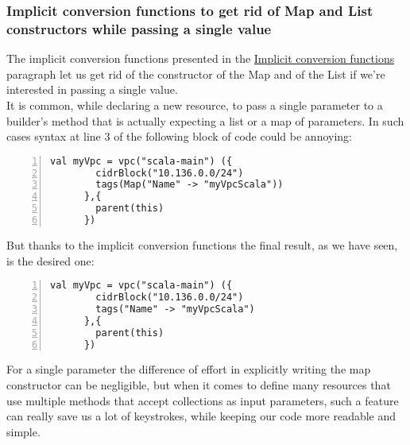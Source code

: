 \subsubsection{Implicit conversion functions to get rid of Map and List constructors while passing a single value}
The implicit conversion functions presented in the \hyperref[sssec:implicit-converion-functions]{Implicit conversion functions} paragraph let us get rid of the constructor of the Map and of the List if we're interested in passing a single value.\\
It is common, while declaring a new resource, to pass a single parameter to a builder's method that is actually expecting a list or a map of parameters.
In such cases syntax at line 3 of the following block of code could be annoying:\\
\begin{minipage}{\linewidth}
  \begin{lstlisting}[numbers=left, numberstyle=\tiny, numbersep=-5pt, stepnumber=1]
    val myVpc = vpc("scala-main") ({
        cidrBlock("10.136.0.0/24")
        tags(Map("Name" -> "myVpcScala"))
      },{
        parent(this)
      })
  \end{lstlisting}
  \end{minipage}
But thanks to the implicit conversion functions the final result, as we have seen, is the desired one:\\
\begin{minipage}{\linewidth}
  \begin{lstlisting}[numbers=left, numberstyle=\tiny, numbersep=-5pt, stepnumber=1]
    val myVpc = vpc("scala-main") ({
        cidrBlock("10.136.0.0/24")
        tags("Name" -> "myVpcScala")
      },{
        parent(this)
      })
  \end{lstlisting}
  \end{minipage}
For a single parameter the difference of effort in explicitly writing the map constructor can be negligible, but when it comes to define many resources that use multiple methods that accept collections as input parameters, such a feature can really save us a lot of keystrokes, while keeping our code more readable and simple.

